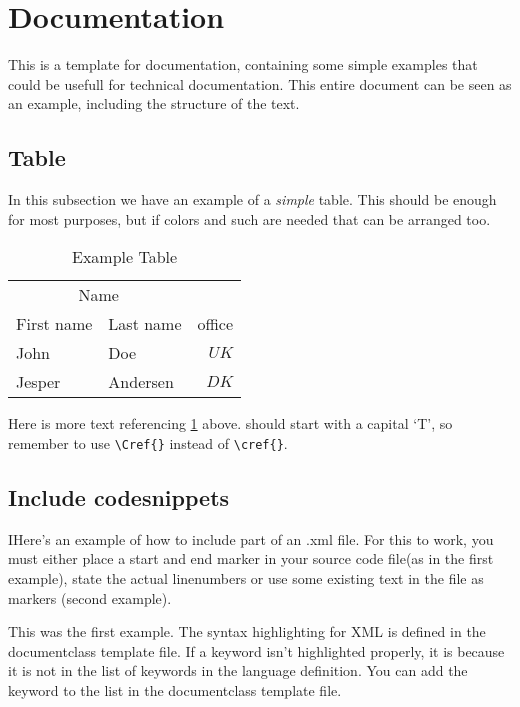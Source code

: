\section{Documentation}
This is a template for documentation, containing some simple examples that could be usefull for technical documentation. This entire document can be seen as an example, including the structure of the text.

\subsection{Table}\label{sec:Table}

In this subsection we have an example of a \emph{simple} table. This should be enough for most purposes, but if colors and such are needed that can be arranged too. 

\begin{table}[!htb]\centering
	\begin{tabular}{llr}
		\toprule
		\multicolumn{2}{c}{Name} \\
		\cmidrule(r){1-2}
		First name & Last name & office \\
		\midrule
		John & Doe & $ UK$ \\
		Jesper & Andersen & $DK$ \\
		\bottomrule
	\end{tabular}
	\caption{Example Table}
	\label{tab:exampleTable}
\end{table}

Here is more text referencing \cref{tab:exampleTable} above.  should start with a capital `T', so remember to use 
\verb$\Cref{}$ instead of \verb$\cref{}$.

\subsection{Include codesnippets}
IHere's an example of how to include part of an .xml file. For this to work, you must either place a start and end marker in your source code file(as in the first example), state the actual linenumbers or use some existing text in the file as markers (second example).
\lstset{language=XML,
	   includerangemarker=false,
	   rangeprefix=<!--\ ,
	   rangesuffix=\ -->}
	   

		        
This was the first example. The syntax highlighting for XML is defined in the documentclass template file. If a keyword isn't highlighted properly, it is because it is not in the list of keywords in the language definition. You can add the keyword to the list in the documentclass template file.

